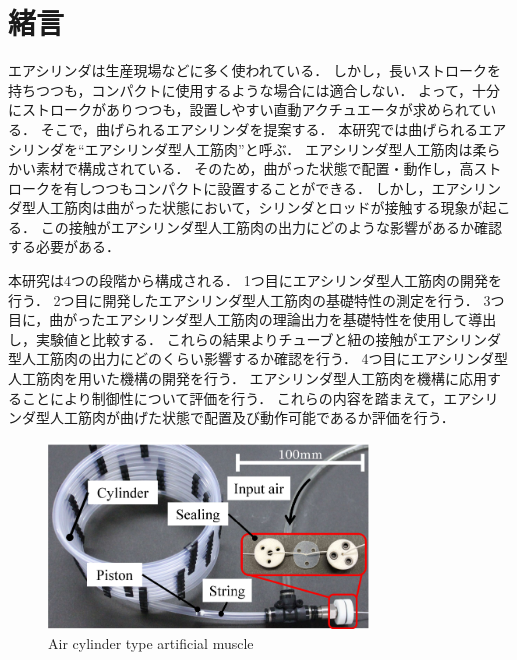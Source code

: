 \section{緒言}%
エアシリンダは生産現場などに多く使われている．
しかし，長いストロークを持ちつつも，コンパクトに使用するような場合には適合しない．
よって，十分にストロークがありつつも，設置しやすい直動アクチュエータが求められている．
そこで，曲げられるエアシリンダを提案する．
本研究では曲げられるエアシリンダを``エアシリンダ型人工筋肉''と呼ぶ．
エアシリンダ型人工筋肉は柔らかい素材で構成されている．
そのため，曲がった状態で配置・動作し，高ストロークを有しつつもコンパクトに設置することができる．
しかし，エアシリンダ型人工筋肉は曲がった状態において，シリンダとロッドが接触する現象が起こる．
この接触がエアシリンダ型人工筋肉の出力にどのような影響があるか確認する必要がある．
\par
本研究は4つの段階から構成される．
1つ目にエアシリンダ型人工筋肉の開発を行う．
2つ目に開発したエアシリンダ型人工筋肉の基礎特性の測定を行う．
3つ目に，曲がったエアシリンダ型人工筋肉の理論出力を基礎特性を使用して導出し，実験値と比較する．
これらの結果よりチューブと紐の接触がエアシリンダ型人工筋肉の出力にどのくらい影響するか確認を行う．
4つ目にエアシリンダ型人工筋肉を用いた機構の開発を行う．
エアシリンダ型人工筋肉を機構に応用することにより制御性について評価を行う．
これらの内容を踏まえて，エアシリンダ型人工筋肉が曲げた状態で配置及び動作可能であるか評価を行う．


\begin{figure}[t]
  \centering
  \includegraphics[width=85mm]{_pdf/細径柔軟エアシリンダ-１本.pdf}
  \caption{Air cylinder type artificial muscle}
  \label{Air cylinder type artificial muscle}
\end{figure}


